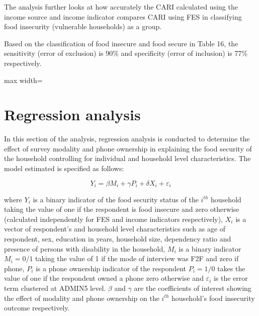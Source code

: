\documentclass[11pt,harvard]{article}
\begin{document}
The analysis further looks at how accurately the CARI calculated using the income source and income indicator compares CARI using FES in classifying food insecurity (vulnerable households) as a group.
 
Based on the classification of food insecure and food secure in Table 16, the sensitivity (error of exclusion) is 90\% and specificity (error of inclusion) is 77\% respectively.


\begin{table}[htbp]
	\centering
	\begin{adjustbox}{max width=\textwidth}
		\begin{threeparttable}
			\caption{Cross Tabulation of Acute Food Insecurity (CAR\_FES vs. CARI\_Income)}
			\scriptsize
			 
			\label{tab:CAR_FS_Cross_Tabulation}
		\end{threeparttable}
	\end{adjustbox}
\end{table}

\pagebreak


\section{Regression analysis}

In this section of the analysis, regression analysis is conducted to determine the effect of survey modality and phone ownership in explaining the food security of the household controlling for individual and household level characteristics. The model estimated is specified as follows:

	\[Y_{i}=\beta M_{i}+ \gamma P_{i}+ \delta X_{i}+ \varepsilon_{i} \tag{1}\] 

where \(Y_{i}\) is a binary indicator of the food security status of the \(i^{th}\) household taking the value of one if the respondent is food insecure
and zero otherwise (calculated independently for FES and income indicators respectively), \(X_{i}\) is a vector of respondent's and household level characteristics such as age of respondent, sex, education in years, household size, dependency ratio and presence of persons with disability in the household, \(M_{i}\) is a binary indicator \(M_{i}=0/1\) taking the value of 1 if the mode of interview was F2F and zero if  phone, \(P_{i}\) is a phone ownership indicator of the respondent \(P_{i}=1/0\) takes the value of one if the respondent owned a phone zero otherwise and \(\varepsilon_{i}\) is the error term clustered at ADMIN5 level. \(\beta\) and \(\gamma\) are the coefficients of interest showing the effect of modality and phone ownership  on the \(i^{th}\) household's food insecurity outcome respectively.
\end{document}
